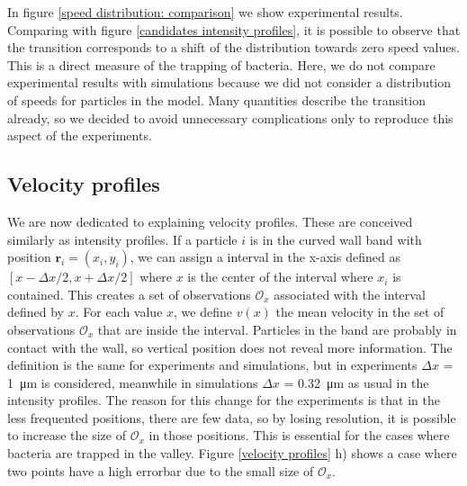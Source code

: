 
In figure \ref{speed distribution: comparison} we show experimental results. Comparing with figure \ref{candidates intensity profiles}, it is possible to observe that the transition corresponds to a shift of the distribution towards zero speed values. This is a direct measure of the trapping of bacteria. Here, we do not compare experimental results with simulations because we did not consider a distribution of speeds for particles in the model. Many quantities describe the transition already, so we decided to avoid unnecessary complications only to reproduce this aspect of the experiments.

\subsection{Velocity profiles}

We are now dedicated to explaining velocity profiles. These are conceived similarly as intensity profiles. If a particle $i$ is in the curved wall band with position $\textbf{r}_i =(x_i, y_i)$, we can assign a interval in the x-axis defined as $[x-\Delta x/2,x+\Delta x/2]$ where $x$ is the center of the interval where $x_i$ is contained. This creates a set of observations $\mathcal{O}_x$ associated with the interval defined by $x$. For each value $x$, we define $v(x)$ the mean velocity in the set of observations $\mathcal{O}_x$ that are inside the interval. Particles in the band are probably in contact with the wall, so vertical position does not reveal more information. The definition is the same for experiments and simulations, but in experiments $\Delta x $ = \SI{1}{\micro\meter} is considered, meanwhile in simulations $\Delta x $ = \SI{0.32}{\micro\meter} as usual in the intensity profiles. The reason for this change for the experiments is that in the less frequented positions, there are few data, so by losing resolution, it is possible to increase the size of $\mathcal{O}_x$ in those positions. This is essential for the cases where bacteria are trapped in the valley. Figure \ref{velocity profiles} h) shows a case where two points have a high errorbar due to the small size of $\mathcal{O}_x$.

